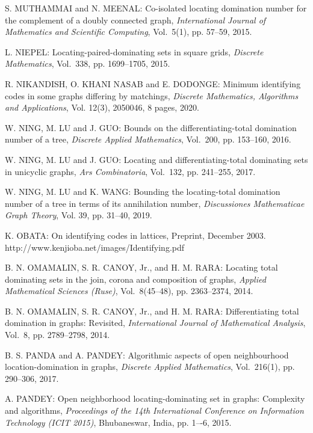 \begin{thebibliography}{999}
S. MUTHAMMAI and N. MEENAL: Co-isolated locating domination number for the complement of a doubly connected graph, {\it International Journal of Mathematics and Scientific Computing}, Vol.~5(1), pp. 57--59, 2015.

L. NIEPEL: Locating-paired-dominating sets in square grids, {\it Discrete Mathematics}, Vol.~338, pp. 1699--1705, 2015.

R. NIKANDISH, O. KHANI NASAB and E. DODONGE: Minimum identifying codes in some graphs differing by matchings, {\it Discrete Mathematics, Algorithms and Applications}, Vol. 12(3), 2050046, 8 pages, 2020.

W. NING, M. LU and J. GUO: Bounds on the differentiating-total domination number of a tree, {\it Discrete Applied Mathematics}, Vol.~200, pp. 153--160, 2016.

W. NING, M. LU and J. GUO: Locating and differentiating-total dominating sets in unicyclic graphs, {\it Ars Combinatoria}, Vol.~132, pp. 241--255, 2017.

W. NING, M. LU and K. WANG: Bounding the locating-total domination number of a tree in terms of its annihilation number, {\it Discussiones Mathematicae Graph Theory}, Vol. 39, pp. 31--40, 2019.

K. OBATA: On identifying codes in lattices, Preprint, December 2003.\\ http://www.kenjioba.net/images/Identifying.pdf

B. N. OMAMALIN, S. R. CANOY, Jr., and H. M. RARA: Locating total dominating sets in the join, corona and composition of graphs, {\it Applied Mathematical Sciences (Ruse)}, Vol.~8(45--48), pp. 2363--2374, 2014.

B. N. OMAMALIN, S. R. CANOY, Jr., and H. M. RARA: Differentiating total domination in graphs: Revisited, {\it International Journal of Mathematical Analysis}, Vol.~8, pp. 2789--2798, 2014.

B. S. PANDA and A. PANDEY: Algorithmic aspects of open neighbourhood location-domination in graphs, {\it Discrete Applied Mathematics}, Vol.~216(1), pp. 290--306, 2017.

A. PANDEY: Open neighborhood locating-dominating set in graphs: Complexity and algorithms, {\it Proceedings of the 14th International Conference on Information Technology (ICIT 2015)}, Bhubaneswar, India, pp. 1–-6, 2015.


\end{thebibliography}

